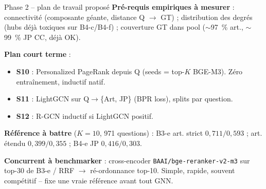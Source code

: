 \documentclass[aspectratio=169,10pt]{beamer}
\newcommand{\crossbox}[1]{%
  \begin{center}
  \colorbox{violet!10}{\parbox{0.92\linewidth}{\centering #1}}
  \end{center}}
\begin{document}
\begin{frame}{Phase 2 -- plan de travail proposé}
  \footnotesize
  \textbf{Pré-requis empiriques à mesurer} :
  connectivité (composante géante, distance Q $\to$ GT) ; distribution des degrés (hubs déjà
  toxiques sur B4-c/B4-f) ; couverture GT dans pool ($\sim$97~\% art., $\sim$99~\% JP CC, déjà OK).

  \vspace{0.3em}
  \textbf{Plan court terme} :
  \begin{itemize}\setlength\itemsep{0.05em}
    \item \textbf{S10} : Personalized PageRank depuis Q (seeds = top-$K$ BGE-M3). Zéro entraînement, inductif natif.
    \item \textbf{S11} : LightGCN sur Q$\to$\{Art, JP\} (BPR loss), splits par question.
    \item \textbf{S12} : R-GCN inductif si LightGCN positif.
  \end{itemize}

  \vspace{0.3em}
  \textbf{Référence à battre} ($K{=}10$, 971 questions) :
  B3-e art. strict $0{,}711/0{,}593$ ; art. étendu $0{,}399/0{,}355$ ; B4-e JP $0{,}416/0{,}303$.

  \vspace{0.3em}
  \crossbox{\scriptsize\textbf{Concurrent à benchmarker} : cross-encoder \texttt{BAAI/bge-reranker-v2-m3}
  sur top-30 de B3-e / RRF $\to$ ré-ordonnance top-10. Simple, rapide, souvent compétitif --
  fixe une vraie référence avant tout GNN.}
\end{frame}
\end{document}
